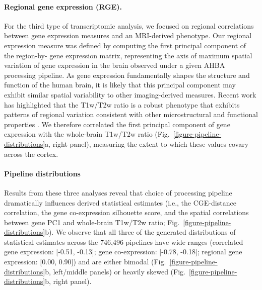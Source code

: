 \documentclass[12pt,aps,pra,reprint,showkeys]{revtex4-1}
\begin{document}
\paragraph*{Regional gene expression (RGE).}

For the third type of transcriptomic analysis, we focused on regional correlations between gene expression measures and an MRI-derived phenotype.
Our regional expression measure was defined by computing the first principal component of the region-by- gene expression matrix, representing the axis of maximum spatial variation of gene expression in the brain observed under a given AHBA processing pipeline.
As gene expression fundamentally shapes the structure and function of the human brain, it is likely that this principal component may exhibit similar spatial variability to other imaging-derived measures.
Recent work has highlighted that the T1w/T2w ratio is a robust phenotype that exhibits patterns of regional variation consistent with other microstructural and functional properties \citep{gao2020elife, burt2018natneuro, demirtas2019neuron, fulcher2019pnas}.
We therefore correlated the first principal component of gene expression with the whole-brain T1w/T2w ratio (Fig.~\ref{figure-pipeline-distributions}a, right panel), measuring the extent to which these values covary across the cortex.

\paragraph*{Pipeline distributions}

Results from these three analyses reveal that choice of processing pipeline dramatically influences derived statistical estimates (i.e., the CGE-distance correlation, the gene co-expression silhouette score, and the spatial correlations between gene PC1 and whole-brain T1w/T2w ratio; Fig.~\ref{figure-pipeline-distributions}b).
We observe that all three of the generated distributions of statistical estimates across the 746,496 pipelines have wide ranges (correlated gene expression: [-0.51, -0.13]; gene co-expression: [-0.78, -0.18]; regional gene expression: [0.00, 0.90]) and are either bimodal (Fig.~\ref{figure-pipeline-distributions}b, left/middle panels) or heavily skewed (Fig.~\ref{figure-pipeline-distributions}b, right panel).
\end{document}

